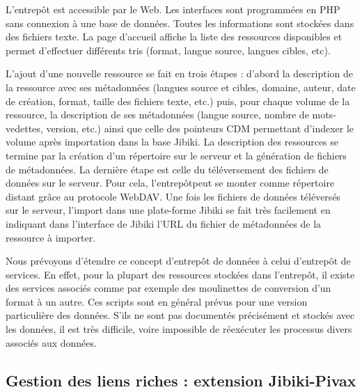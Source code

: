 \documentclass[10pt,a4paper,twoside]{article}
\begin{document}
L'entrepôt est accessible par le Web. Les interfaces sont programmées en PHP sans connexion à une base de données. Toutes les informations sont stockées dans des fichiers texte. 
La page d'accueil affiche la liste des ressources disponibles et permet d'effectuer différents tris (format, langue source, langues cibles, etc).

L'ajout d'une nouvelle ressource se fait en trois étapes : d'abord la description de la ressource avec ses métadonnées (langues source et cibles, domaine, auteur, date de création, format, taille des fichiers texte, etc.) puis, pour chaque volume de la ressource, la description de ses métadonnées (langue source, nombre de mots-vedettes, version, etc.) ainsi que celle des pointeurs CDM permettant d'indexer le volume après importation dans la base Jibiki.
La description des ressources se termine par la création d'un répertoire sur le serveur et la génération de fichiers de métadonnées.
La dernière étape est celle du téléversement des fichiers de données sur le serveur. Pour cela, l'entrepôtpeut se monter comme répertoire distant grâce au protocole WebDAV.
Une fois les fichiers de données téléversés sur le serveur, l'import dans une plate-forme Jibiki se fait très facilement en indiquant dans l'interface de Jibiki l'URL du fichier de métadonnées de la ressource à importer.

Nous prévoyons d'étendre ce concept d'entrepôt de données à celui d'entrepôt de services. En effet, pour la plupart des ressources stockées dans l'entrepôt, il existe des services associés comme par exemple des moulinettes de conversion d'un format à un autre. Ces scripts sont en général prévus pour une version particulière des données. S'ils ne sont pas documentés précisément et stockés avec les données, il est très difficile, voire impossible de réexécuter les processus divers associés aux données.


\subsection{Gestion des liens riches : extension Jibiki-Pivax}
\end{document}
